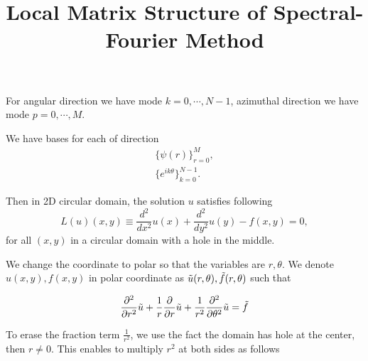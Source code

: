 \documentclass[11pt,letterpaper]{article}
\begin{document}
\title{{\bfseries Local Matrix Structure of Spectral-Fourier Method}
}






%
For angular direction we have mode $k = 0, \cdots, N-1$, azimuthal
direction we have mode $p = 0, \cdots, M$.

We have bases for each of direction
\begin{align}
\{\psi(r) \}_{r=0}^M,\\
\{e^{ik\theta}\}_{k=0}^{N-1}.
\end{align}

Then in 2D circular domain, the solution $u$ satisfies following
\begin{equation}
L(u)(x,y) \equiv \frac{d^2}{dx^2} u(x) + \frac{d^2}{dy^2} u(y)-
f(x,y) = 0,
\end{equation}
for all $(x,y)$ in a circular domain with a hole in the middle.


We change the coordinate to polar so that the variables are $r,
\theta$. We denote $u(x, y), f(x, y)$ in polar coordinate as
$\Tilde{u}(r, \theta), \Tilde{f}(r, \theta)$ such that

\begin{equation}
\frac{\partial^2}{\partial r^2} \Tilde{u} +
\frac{1}{r}\frac{\partial}{\partial r} \Tilde{u} +
\frac{1}{r^2}\frac{\partial^2}{\partial \theta^2} \Tilde{u} =
\Tilde{f}
\end{equation}

To erase the fraction term $\frac{1}{r^2}$, we use the fact the
domain has hole at the center, then $r \ne 0$. This enables to
multiply $r^2$ at both sides as follows
\end{document}

